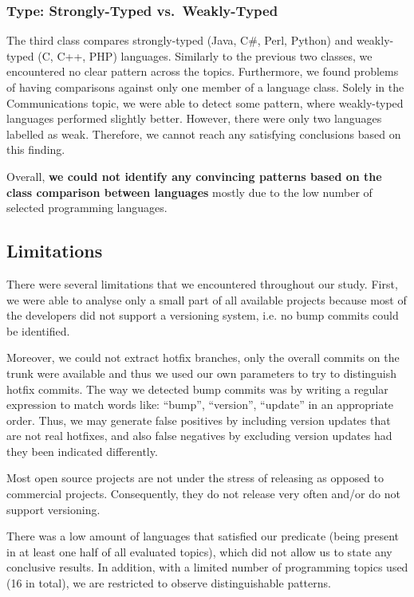 \documentclass{sig-alternate}
\begin{document}
\subsubsection*{Type: Strongly-Typed vs.\ Weakly-Typed}
The third class compares strongly-typed (Java, C\#, Perl, Python) and weakly-typed (C, C++, PHP) languages. Similarly to the previous two classes, we encountered no clear pattern across the topics. Furthermore, we found problems of having comparisons against only one member of a language class. Solely in the Communications topic, we were able to detect some pattern, where weakly-typed languages performed slightly better. However, there were only two languages labelled as weak. Therefore, we cannot reach any satisfying conclusions based on this finding.

Overall, \textbf{we could not identify any convincing patterns based on the class comparison between languages} mostly due to the low number of selected programming languages.

\subsection{Limitations}
There were several limitations that we encountered throughout our study. First, we were able to analyse only a small part of all available projects because most of the developers did not support a versioning system, i.e. no bump commits could be identified.

Moreover, we could not extract hotfix branches, only the overall commits on the trunk were available and thus we used our own parameters to try to distinguish hotfix commits. The way we detected bump commits was by writing a regular expression to match words like:  ``bump'', ``version'', ``update'' in an appropriate order. Thus, we may generate false positives by including version updates that are not real hotfixes, and also false negatives by excluding version updates had they been indicated differently.

Most open source projects are not under the stress of releasing as opposed to commercial projects. Consequently, they do not release very often and/or do not support versioning.

There was a low amount of languages that satisfied our predicate (being present in at least one half of all evaluated topics), which did not allow us to state any conclusive results. In addition, with a limited number of programming topics used (16 in total), we are restricted to observe distinguishable patterns.
\end{document}
